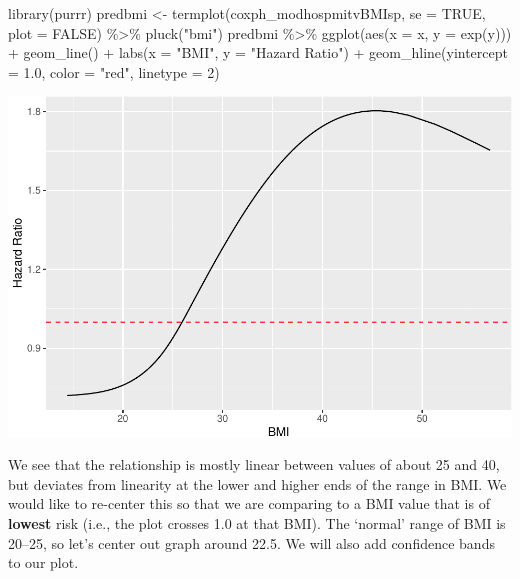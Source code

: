 \documentclass[
]{book}
\newenvironment{Shaded}{\begin{snugshade}}{\end{snugshade}}
\newcommand{\AttributeTok}[1]{\textcolor[rgb]{0.77,0.63,0.00}{#1}}
\newcommand{\ConstantTok}[1]{\textcolor[rgb]{0.00,0.00,0.00}{#1}}
\newcommand{\DecValTok}[1]{\textcolor[rgb]{0.00,0.00,0.81}{#1}}
\newcommand{\FloatTok}[1]{\textcolor[rgb]{0.00,0.00,0.81}{#1}}
\newcommand{\FunctionTok}[1]{\textcolor[rgb]{0.00,0.00,0.00}{#1}}
\newcommand{\NormalTok}[1]{#1}
\newcommand{\OtherTok}[1]{\textcolor[rgb]{0.56,0.35,0.01}{#1}}
\newcommand{\SpecialCharTok}[1]{\textcolor[rgb]{0.00,0.00,0.00}{#1}}
\newcommand{\StringTok}[1]{\textcolor[rgb]{0.31,0.60,0.02}{#1}}
\begin{document}
\begin{Shaded}
\begin{Highlighting}[]
\FunctionTok{library}\NormalTok{(purrr)}
\NormalTok{predbmi }\OtherTok{\textless{}{-}} \FunctionTok{termplot}\NormalTok{(coxph\_modhospmitvBMIsp, }\AttributeTok{se =} \ConstantTok{TRUE}\NormalTok{, }\AttributeTok{plot =} \ConstantTok{FALSE}\NormalTok{) }\SpecialCharTok{\%\textgreater{}\%}
  \FunctionTok{pluck}\NormalTok{(}\StringTok{"bmi"}\NormalTok{)}
\NormalTok{predbmi }\SpecialCharTok{\%\textgreater{}\%}
  \FunctionTok{ggplot}\NormalTok{(}\FunctionTok{aes}\NormalTok{(}\AttributeTok{x =}\NormalTok{ x, }\AttributeTok{y =} \FunctionTok{exp}\NormalTok{(y))) }\SpecialCharTok{+} 
  \FunctionTok{geom\_line}\NormalTok{() }\SpecialCharTok{+} 
  \FunctionTok{labs}\NormalTok{(}\AttributeTok{x =} \StringTok{"BMI"}\NormalTok{, }
       \AttributeTok{y =} \StringTok{"Hazard Ratio"}\NormalTok{) }\SpecialCharTok{+} 
  \FunctionTok{geom\_hline}\NormalTok{(}\AttributeTok{yintercept =} \FloatTok{1.0}\NormalTok{, }\AttributeTok{color =} \StringTok{"red"}\NormalTok{, }\AttributeTok{linetype =} \DecValTok{2}\NormalTok{)  }
\end{Highlighting}
\end{Shaded}

\includegraphics{adv_epi_analysis_files/figure-latex/unnamed-chunk-244-1.pdf}

We see that the relationship is mostly linear between values of about 25 and 40, but deviates from linearity at the lower and higher ends of the range in BMI. We would like to re-center this so that we are comparing to a BMI value that is of \textbf{lowest} risk (i.e., the plot crosses 1.0 at that BMI). The `normal' range of BMI is 20--25, so let's center out graph around 22.5. We will also add confidence bands to our plot.
\end{document}
